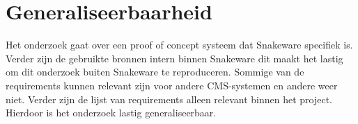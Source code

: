 \section{Generaliseerbaarheid}
Het onderzoek gaat over een proof of concept systeem dat Snakeware specifiek is.
Verder zijn de gebruikte bronnen intern binnen Snakeware dit maakt het lastig om dit onderzoek buiten Snakeware te reproduceren.
Sommige van de requirements kunnen relevant zijn voor andere CMS-systemen en andere weer niet.
Verder zijn de lijst van requirements alleen relevant binnen het project.
Hierdoor is het onderzoek lastig generaliseerbaar.
